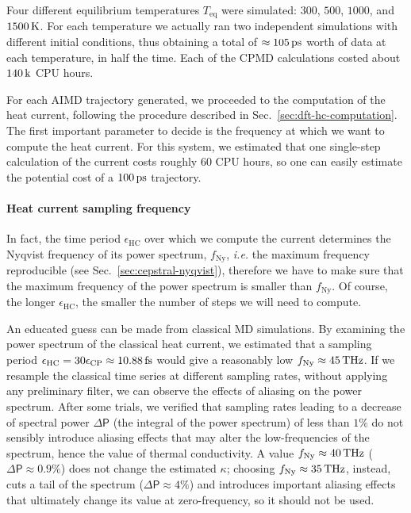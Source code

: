 Four different equilibrium temperatures $T_\mathrm{eq}$ were simulated: $300$, $500$, $1000$, and $1500\,\mathrm{K}$. For each temperature we actually ran two independent simulations with different initial conditions, thus obtaining a total of $\approx 105\,\mathrm{ps}$ worth of data at each temperature, in half the time. 
Each of the CPMD calculations costed about $140\,\mathrm{k}$ CPU hours.



\medskip
For each AIMD trajectory generated, we proceeded to the computation of the \abinitio heat current, following the procedure described in Sec.~\ref{sec:dft-hc-computation}. 
The first important parameter to decide is the frequency at which we want to compute the heat current. For this system, we estimated that one single-step calculation of the current costs roughly $60$ CPU hours, so one can easily estimate the potential cost of a $100\,\mathrm{ps}$ trajectory. 


\paragraph{Heat current sampling frequency}
In fact, the time period $\epsilon_\mathrm{HC}$ over which we compute the current determines the Nyqvist frequency of its power spectrum, $f_\mathrm{Ny}$, \emph{i.e.} the maximum frequency reproducible (see Sec.~\ref{sec:cepstral-nyqvist}), therefore we have to make sure that the maximum frequency of the power spectrum is smaller than $f_\mathrm{Ny}$. Of course, the longer $\epsilon_\mathrm{HC}$, the smaller the number of steps we will need to compute. 

An educated guess can be made from classical MD simulations. By examining the power spectrum of the classical heat current, we estimated that a sampling period $\epsilon_\mathrm{HC} = 30 \epsilon_\mathrm{CP} \approx 10.88\,\mathrm{fs}$ would give a reasonably low $f_\mathrm{Ny}\approx 45\,\mathrm{THz}$. 
If we resample the classical time series at different sampling rates, without applying any preliminary filter, we can observe the effects of aliasing on the power spectrum. 
After some trials, we verified that sampling rates leading to a decrease of spectral power $\Delta\mathsf{P}$ (the integral of the power spectrum) of less than $1\%$ do not sensibly introduce aliasing effects that may alter the low-frequencies of the spectrum, hence the value of thermal conductivity. A value $f_\mathrm{Ny} \approx 40\,\mathrm{THz}$ ($\Delta\mathsf{P} \approx 0.9\%$) does not change the estimated $\kappa$; choosing $f_\mathrm{Ny} \approx 35\,\mathrm{THz}$, instead, cuts a tail of the spectrum ($\Delta\mathsf{P} \approx 4\%$) and introduces important aliasing effects that ultimately change its value at zero-frequency, so it should not be used. 

